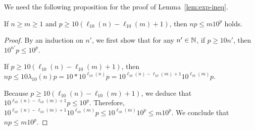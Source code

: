 We need the following proposition for the proof of Lemma~\ref{lem:exp-ineq}.

\begin{proposition} \label{prop:1}
If $n\ge m\ge 1$ and $p \ge 10(\ell_{10}(n)- \ell_{10}(m)+1)$, then 
$n p \le m10^p$ holds.
\end{proposition}

\begin{proof}
By an induction on $n'$, we first show that for any $n' \in \mathbb{N}$, if $p \ge 10n'$, then $10^{n'} p \le 10^p$. 

If $ p \ge 10 (\ell_{10}(n) - \ell_{10}(m)+1)$, then  $n p \le 10\lambda_{10}(n) p = 10 * 10^{\ell_{10}(n)} p = 10^{\ell_{10}(n)-\ell_{10}(m) + 1}  10^{\ell_{10}(m)} p$.

Because $p \ge 10(\ell_{10}(n)-\ell_{10}(m) + 1)$, we deduce that $10^{\ell_{10}(n)-\ell_{10}(m) + 1}  p \le 10^p$.  Therefore, $10^{\ell_{10}(n)-\ell_{10}(m) + 1}  10^{\ell_{10}(m)} p \le 10^{\ell_{10}(m)} 10^p \le m 10^p$.
We conclude that $np \le m 10^p$.
\end{proof}


